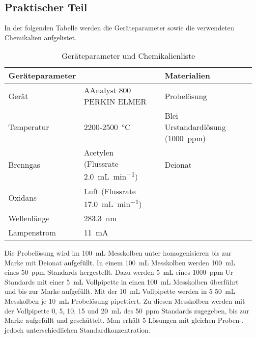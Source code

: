 \subsection{Praktischer Teil} \label{sec:PraktischerTeilAAS}
  
  In der folgenden Tabelle werden die Geräteparameter sowie die verwendeten Chemikalien aufgelistet.
  
  \begin{table}[H]
    \centering
    \caption[Geräteparameter und Chemikalienliste, Quelle: Autor]{Geräteparameter und Chemikalienliste}
    
    \label{tab:GerateparameterAAS}
    \begin{tabular}{@{}lll|lp{4.5cm}l@{}}
      \toprule
      Geräteparameter &  &  & Materialien   \\ \midrule
        Gerät & AAnalyst 800 PERKIN ELMER &  & Probelösung  \\ 
        Temperatur & 2200-\SI[mode=text]{2500}{\degreeCelsius} &  & Blei-Urstandardlösung (\SI[mode=text]{1000}{ppm}) \\
        Brenngas & Acetylen (Flussrate \SI[mode=text]{2.0}{\milli\liter\per\minute}) &  & Deionat \\
        Oxidans & Luft (Flussrate \SI[mode=text]{17.0}{\milli\liter\per\minute}) &  &  \\
        Wellenlänge & \SI[mode=text]{283.3}{\nano\meter} &  &  \\
        Lampenstrom & \SI[mode=text]{11}{\milli\ampere} &  &  \\ \bottomrule
    \end{tabular}
  \end{table}
  
  \noindent Die Probelösung wird im \SI[mode=text]{100}{\milli\liter} Messkolben unter homogenisieren bis zur Marke mit Deionat aufgefüllt. In einem \SI[mode=text]{100}{\milli\liter} Messkolben werden \SI[mode=text]{100}{\milli\liter} eines \SI[mode=text]{50}{ppm}  Standards hergestellt. Dazu werden \SI[mode=text]{5}{\milli\liter} eines \SI[mode=text]{1000}{ppm}  Ur-Standards mit einer \SI[mode=text]{5}{\milli\liter} Vollpipette in einen \SI[mode=text]{100}{\milli\liter} Messkolben überführt und  bis zur Marke aufgefüllt. Mit der \SI[mode=text]{10}{\milli\liter} Vollpipette werden in 5 \SI[mode=text]{50}{\milli\liter} Messkolben je \SI[mode=text]{10}{\milli\liter} Probelösung pipettiert. Zu diesen Messkolben werden mit der Vollpipette 0, 5, 10, 15 und \SI[mode=text]{20}{\milli\liter} des \SI[mode=text]{50}{ppm}  Standards zugegeben, bis zur Marke aufgefüllt und geschüttelt. Man erhält 5 Lösungen mit gleichen Proben-, jedoch unterschiedlichen Standardkonzentration. \\
  

